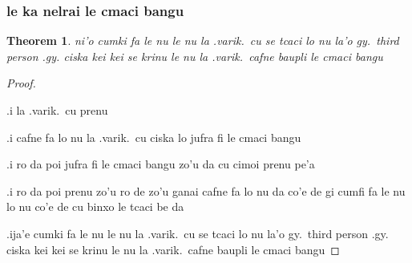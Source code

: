\documentclass{article}
\newtheorem{thm}{Theorem}
\begin{document}
\subsubsection{le ka nelrai le cmaci bangu}
\begin{thm}
	ni'o cumki fa le nu le nu la .varik.\ cu se tcaci lo nu la'o gy.\ third person .gy. ciska kei kei se krinu le nu la .varik.\ cafne baupli le cmaci bangu
\end{thm}
\begin{proof}
	${ }$

	.i la .varik.\ cu prenu

	.i cafne fa lo nu la .varik.\ cu ciska lo jufra fi le cmaci bangu

	.i ro da poi jufra fi le cmaci bangu zo'u da cu cimoi prenu pe'a

	.i ro da poi prenu zo'u ro de zo'u ganai cafne fa lo nu da co'e de gi cumfi fa le nu lo nu co'e de cu binxo le tcaci be da

	.ija'e cumki fa le nu le nu la .varik.\ cu se tcaci lo nu la'o gy.\ third person .gy. ciska kei kei se krinu le nu la .varik.\ cafne baupli le cmaci bangu
\end{proof}
\end{document}
